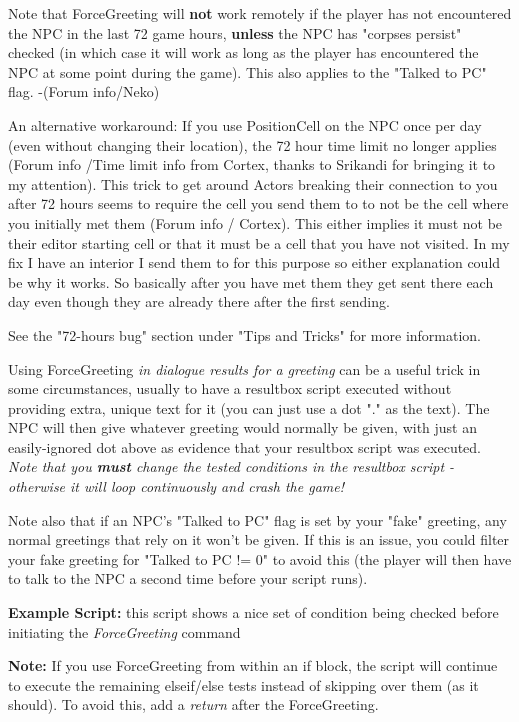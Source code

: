 \documentclass[
]{article}
\begin{document}
Note that ForceGreeting will \textbf{not} work remotely if the player
has not encountered the NPC in the last 72 game hours, \textbf{unless}
the NPC has "corpses persist" checked (in which case it will work as
long as the player has encountered the NPC at some point during the
game). This also applies to the "Talked to PC" flag. -(Forum info/Neko)

An alternative workaround: If you use PositionCell on the NPC once per
day (even without changing their location), the 72 hour time limit no
longer applies (Forum info /Time limit info from Cortex, thanks to
Srikandi for bringing it to my attention). This trick to get around
Actors breaking their connection to you after 72 hours seems to require
the cell you send them to to not be the cell where you initially met
them (Forum info / Cortex). This either implies it must not be their
editor starting cell or that it must be a cell that you have not
visited. In my fix I have an interior I send them to for this purpose so
either explanation could be why it works. So basically after you have
met them they get sent there each day even though they are already there
after the first sending.

See the "72-hours bug" section under "Tips and Tricks" for more
information.

Using ForceGreeting \emph{in dialogue results for a greeting} can be a
useful trick in some circumstances, usually to have a resultbox script
executed without providing extra, unique text for it (you can just use a
dot "." as the text). The NPC will then give whatever greeting would
normally be given, with just an easily-ignored dot above as evidence
that your resultbox script was executed. \emph{Note that you
\textbf{must} change the tested conditions in the resultbox script -
otherwise it will loop continuously and crash the game!}

Note also that if an NPC's "Talked to PC" flag is set by your "fake"
greeting, any normal greetings that rely on it won't be given. If this
is an issue, you could filter your fake greeting for "Talked to PC != 0"
to avoid this (the player will then have to talk to the NPC a second
time before your script runs).

\textbf{Example Script:} this script shows a nice set of condition being
checked before initiating the \emph{ForceGreeting} command



\textbf{Note:} If you use ForceGreeting from within an if block, the
script will continue to execute the remaining elseif/else tests instead
of skipping over them (as it should). To avoid this, add a \emph{return}
after the ForceGreeting.
\end{document}
